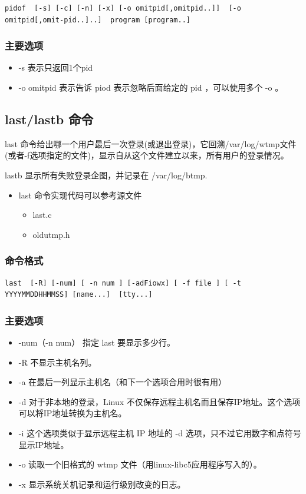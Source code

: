 {\begin{shaded}\begin{verbatim}
pidof  [-s] [-c] [-n] [-x] [-o omitpid[,omitpid..]]  [-o omitpid[,omit‐pid..]..]  program [program..]
\end{verbatim}\end{shaded}}
\subsubsection{主要选项}

\begin{itemize}
\item
  -s 表示只返回1个pid
\item
  -o omitpid 表示告诉 piod 表示忽略后面给定的 pid ，可以使用多个 -o 。
\end{itemize}
\subsection{last/lastb 命令}

last
命令给出哪一个用户最后一次登录(或退出登录)，它回溯/var/log/wtmp文件(或者-f选项指定的文件)，显示自从这个文件建立以来，所有用户的登录情况。

lastb 显示所有失败登录企图，并记录在 /var/log/btmp.

\begin{itemize}
\item
  last 命令实现代码可以参考源文件
  \begin{itemize}
  \item
    last.c
  \item
    oldutmp.h
  \end{itemize}
\end{itemize}
\subsubsection{命令格式}

{\begin{shaded}\begin{verbatim}
last  [-R] [-num] [ -n num ] [-adFiowx] [ -f file ] [ -t YYYYMMDDHHMMSS] [name...]  [tty...]
\end{verbatim}\end{shaded}}
\subsubsection{主要选项}

\begin{itemize}
\item
  -num（-n num） 指定 last 要显示多少行。
\item
  -R 不显示主机名列。
\item
  -a 在最后一列显示主机名（和下一个选项合用时很有用）
\item
  -d 对于非本地的登录，Linux
  不仅保存远程主机名而且保存IP地址。这个选项可以将IP地址转换为主机名。
\item
  -i 这个选项类似于显示远程主机 IP 地址的 -d
  选项，只不过它用数字和点符号显示IP地址。
\item
  -o 读取一个旧格式的 wtmp 文件（用linux-libc5应用程序写入的）。
\item
  -x 显示系统关机记录和运行级别改变的日志。
\end{itemize}
